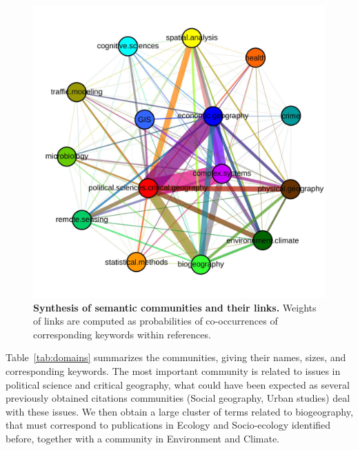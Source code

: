 \begin{figure}
\centering
\includegraphics[width=\textwidth]{figures/Fig8.jpg}
\caption{\textbf{Synthesis of semantic communities and their links.} Weights of links are computed as probabilities of co-occurrences of corresponding keywords within references. }
\label{fig:comsynthesis}
\end{figure}

Table~\ref{tab:domains} summarizes the communities, giving their names, sizes, and corresponding keywords. The most important community is related to issues in political science and critical geography, what could have been expected as several previously obtained citations communities (Social geography, Urban studies) deal with these issues. We then obtain a large cluster of terms related to biogeography, that must correspond to publications in Ecology and Socio-ecology identified before, together with a community in Environment and Climate.


